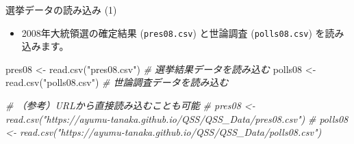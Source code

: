 \documentclass[
  ignorenonframetext,
]{beamer}
\newenvironment{Shaded}{\begin{snugshade}}{\end{snugshade}}
\newcommand{\CommentTok}[1]{\textcolor[rgb]{0.56,0.35,0.01}{\textit{#1}}}
\newcommand{\FunctionTok}[1]{\textcolor[rgb]{0.00,0.00,0.00}{#1}}
\newcommand{\NormalTok}[1]{#1}
\newcommand{\OtherTok}[1]{\textcolor[rgb]{0.56,0.35,0.01}{#1}}
\newcommand{\StringTok}[1]{\textcolor[rgb]{0.31,0.60,0.02}{#1}}
\providecommand{\tightlist}{%
  \setlength{\itemsep}{0pt}\setlength{\parskip}{0pt}}
\begin{document}
\begin{frame}[fragile]{選挙データの読み込み (1)}
\protect\hypertarget{ux9078ux6319ux30c7ux30fcux30bfux306eux8aadux307fux8fbcux307f-1}{}
\begin{itemize}
\tightlist
\item
  2008年大統領選の確定結果 (\texttt{pres08.csv}) と世論調査
  (\texttt{polls08.csv}) を読み込みます。
\end{itemize}

\scriptsize

\begin{Shaded}
\begin{Highlighting}[]
\NormalTok{pres08 }\OtherTok{\textless{}{-}} \FunctionTok{read.csv}\NormalTok{(}\StringTok{"pres08.csv"}\NormalTok{)   }\CommentTok{\# 選挙結果データを読み込む}
\NormalTok{polls08 }\OtherTok{\textless{}{-}} \FunctionTok{read.csv}\NormalTok{(}\StringTok{"polls08.csv"}\NormalTok{) }\CommentTok{\# 世論調査データを読み込む}

\CommentTok{\# （参考）URLから直接読み込むことも可能}
\CommentTok{\# pres08 \textless{}{-} read.csv("https://ayumu{-}tanaka.github.io/QSS/QSS\_Data/pres08.csv")}
\CommentTok{\# polls08 \textless{}{-} read.csv("https://ayumu{-}tanaka.github.io/QSS/QSS\_Data/polls08.csv")}
\end{Highlighting}
\end{Shaded}

\normalsize
\end{frame}
\end{document}
